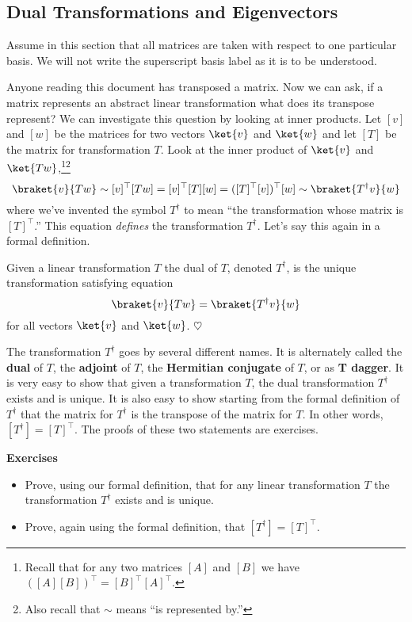 \subsection{Dual Transformations and Eigenvectors}
Assume in this section that all matrices are taken with respect to one particular basis.  We will not write the superscript basis label as it is to be understood.

Anyone reading this document has transposed a matrix.  Now we can ask, if a matrix represents an abstract linear transformation what does its transpose represent?  We can investigate this question by looking at inner products.  Let $[v]$ and $[w]$ be the matrices for two vectors $\ket{v}$ and $\ket{w}$ and let $[T]$ be the matrix for transformation $T$.  Look at the inner product of $\ket{v}$ and $\ket{Tw}$,\footnote{Recall that for any two matrices $[A]$ and $[B]$ we have $ ([A][B])^{\top} = [B]^{\top}[A]^{\top}$.}\footnote{Also recall that $\sim$ means ``is represented by.''}
\begin{displaymath} \braket{v}{Tw} \sim [v]^{\top}[Tw] = [v]^{\top}[T][w] = ([T]^{\top}[v])^{\top}[w] \sim \braket{T^{\dag}v}{w} \end{displaymath}
where we've invented the symbol $T^{\dag}$ to mean ``the transformation whose matrix is $[T]^{\top}$.''  This equation \emph{defines} the transformation $T^{\dag}$.  Let's say this again in a formal definition.
\begin{definition}
Given a linear transformation $T$ the dual of $T$, denoted $T^{\dag}$, is the unique transformation satisfying equation
\begin{displaymath} \braket{v}{Tw} = \braket{T^{\dag}v}{w} \end{displaymath}
for all vectors $\ket{v}$ and $\ket{w}$. \quad $\heartsuit$
\end{definition}
The transformation $T^{\dag}$ goes by several different names.  It is alternately called the \textbf{dual} of $T$, the \textbf{adjoint} of $T$, the \textbf{Hermitian conjugate} of $T$, or as \textbf{T dagger}.  It is very easy to show that given a transformation $T$, the dual transformation $T^{\dag}$ exists and is unique.  It is also easy to show starting from the formal definition of $T^{\dag}$ that the matrix for $T^{\dag}$ is the transpose of the matrix for $T$.  In other words, \mbox{$[T^{\dag}] = [T]^{\top}$.}  The proofs of these two statements are exercises.

\begin{flushleft}\textbf{Exercises}\end{flushleft}
\begin{itemize}
\item[1)] Prove, using our formal definition, that for any linear transformation $T$ the transformation $T^{\dag}$ exists and is unique.
\item[2)] Prove, again using the formal definition, that $[T^{\dag}] = [T]^{\top}$.
\end{itemize}

